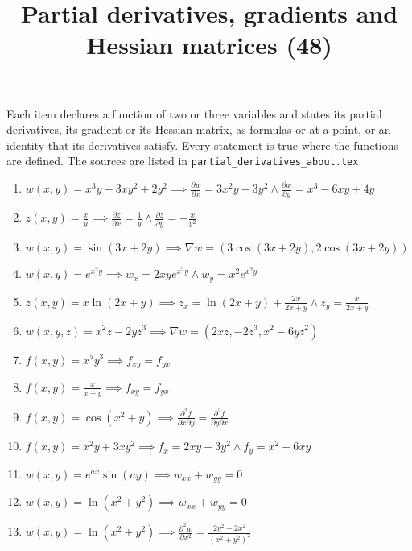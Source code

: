 \documentclass[11pt,a4paper]{article}
\title{Partial derivatives, gradients and Hessian matrices (48)}
\author{}
\date{}
\begin{document}
\maketitle
Each item declares a function of two or three variables and states its partial derivatives, its gradient or its Hessian matrix, as formulas or at a point, or an identity that its derivatives satisfy. Every statement is true where the functions are defined. The sources are listed in \texttt{partial\_derivatives\_about.tex}.

\begin{enumerate}
\item $\displaystyle w(x, y) = x^{3} y - 3xy^{2} + 2y^{2} \implies \frac{\partial w}{\partial x} = 3x^{2} y - 3y^{2} \land \frac{\partial w}{\partial y} = x^{3} - 6xy + 4y$
\item $\displaystyle z(x, y) = \frac{x}{y} \implies \frac{\partial z}{\partial x} = \frac{1}{y} \land \frac{\partial z}{\partial y} = -\frac{x}{y^{2}}$
\item $\displaystyle w(x, y) = \sin(3x + 2y) \implies \nabla w = \left( 3\cos(3x + 2y), 2\cos(3x + 2y) \right)$
\item $\displaystyle w(x, y) = e^{x^{2} y} \implies w_{x} = 2xy e^{x^{2} y} \land w_{y} = x^{2} e^{x^{2} y}$
\item $\displaystyle z(x, y) = x \ln(2x + y) \implies z_{x} = \ln(2x + y) + \frac{2x}{2x + y} \land z_{y} = \frac{x}{2x + y}$
\item $\displaystyle w(x, y, z) = x^{2} z - 2yz^{3} \implies \nabla w = \left( 2xz, -2z^{3}, x^{2} - 6yz^{2} \right)$
\item $\displaystyle f(x, y) = x^{5} y^{3} \implies f_{xy} = f_{yx}$
\item $\displaystyle f(x, y) = \frac{x}{x + y} \implies f_{xy} = f_{yx}$
\item $\displaystyle f(x, y) = \cos(x^{2} + y) \implies \frac{\partial^{2} f}{\partial x \partial y} = \frac{\partial^{2} f}{\partial y \partial x}$
\item $\displaystyle f(x, y) = x^{2} y + 3xy^{2} \implies f_{x} = 2xy + 3y^{2} \land f_{y} = x^{2} + 6xy$
\item $\displaystyle w(x, y) = e^{ax} \sin(ay) \implies w_{xx} + w_{yy} = 0$
\item $\displaystyle w(x, y) = \ln(x^{2} + y^{2}) \implies w_{xx} + w_{yy} = 0$
\item $\displaystyle w(x, y) = \ln(x^{2} + y^{2}) \implies \frac{\partial^{2} w}{\partial x^{2}} = \frac{2y^{2} - 2x^{2}}{(x^{2} + y^{2})^{2}}$

\end{enumerate}
\end{document}
